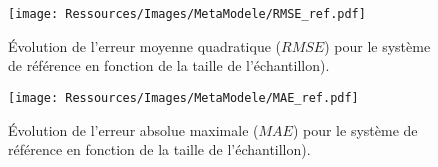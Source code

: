 

\begin{figure}
    \centering
    \texttt{[image: Ressources/Images/MetaModele/RMSE\_ref.pdf]}
    \caption[Évolution de l’erreur moyenne quadratique pour le système de référence]
            {Évolution de l’erreur moyenne quadratique ($RMSE$)
             pour le système de référence en fonction de la taille de
             l’échantillon).}
    \label{fig:rmse_ref_evolution}
\end{figure}

\begin{figure}
    \centering
    \texttt{[image: Ressources/Images/MetaModele/MAE\_ref.pdf]}
    \caption[Évolution de l’erreur absolue maximale pour le système de référence]
            {Évolution de l’erreur absolue maximale ($MAE$)
             pour le système de référence en fonction de la taille de
             l’échantillon).}
    \label{fig:mae_ref_evolution}
\end{figure}


